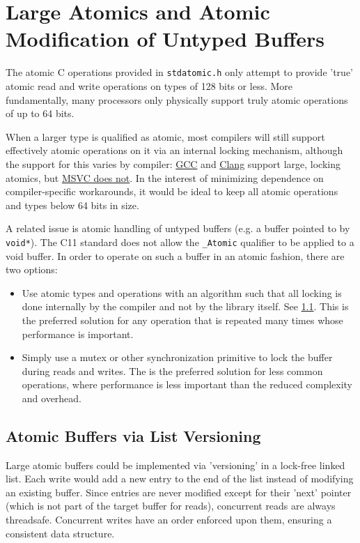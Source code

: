 \section{Large Atomics and Atomic Modification of Untyped Buffers}
\label{app:large-atomics}
The atomic C operations provided in \texttt{stdatomic.h} only attempt to provide 'true' atomic read and write operations on types of 128 bits or less. More fundamentally, many processors only physically support truly atomic operations of up to 64 bits. 

When a larger type is qualified as atomic, most compilers will still support effectively atomic operations on it via an internal locking mechanism, although the support for this varies by compiler: \href{https://gcc.gnu.org/onlinedocs/gcc/_005f_005fatomic-Builtins.html}{GCC} and \href{https://llvm.org/docs/Atomics.html}{Clang} support large, locking atomics, but \href{https://devblogs.microsoft.com/cppblog/c11-atomics-in-visual-studio-2022-version-17-5-preview-2/}{MSVC does not}. In the interest of minimizing dependence on compiler-specific workarounds, it would be ideal to keep all atomic operations and types below 64 bits in size.

A related issue is atomic handling of untyped buffers (e.g. a buffer pointed to by \texttt{void*}). The C11 standard does not allow the \texttt{\_Atomic} qualifier to be applied to a void buffer. In order to operate on such a buffer in an atomic fashion, there are two options:

\begin{itemize}
    \item Use atomic types and operations with an algorithm such that all locking is done internally by the compiler and not by the library itself. See \ref{app:list-versioning}. This is the preferred solution for any operation that is repeated many times whose performance is important.
    
    \item Simply use a mutex or other synchronization primitive to lock the buffer during reads and writes. The is the preferred solution for less common operations, where performance is less important than the reduced complexity and overhead.
\end{itemize}
 

\subsection{Atomic Buffers via List Versioning}
\label{app:list-versioning}
Large atomic buffers could be implemented via 'versioning' in a lock-free linked list. Each write would add a new entry to the end of the list instead of modifying an existing buffer. Since entries are never modified except for their 'next' pointer (which is not part of the target buffer for reads), concurrent reads are always threadsafe. Concurrent writes have an order enforced upon them, ensuring a consistent data structure.

